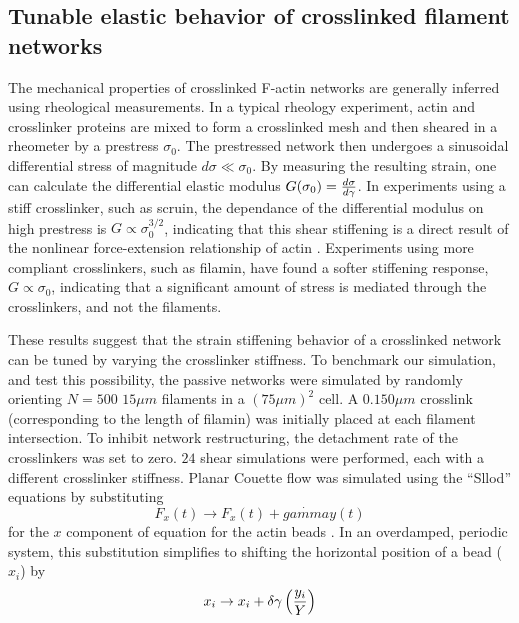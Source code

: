\documentclass[12pt]{article}
\begin{document}
\subsection{Tunable elastic behavior of crosslinked filament networks}
\par
The mechanical properties of crosslinked F-actin networks are generally
inferred using rheological measurements\cite{gardel2004,koenderink2006,kasza2009,lin2010}.
In a typical rheology experiment, actin and crosslinker proteins are mixed to
form a crosslinked mesh and then sheared in a rheometer by a prestress
$\sigma_0$. The prestressed network then undergoes a sinusoidal
differential stress of magnitude $d\sigma\ll\sigma_0$. By measuring the resulting
strain, one can calculate the differential elastic modulus
$G(\sigma_0) = {d\sigma\over d\gamma}$. In experiments using a stiff
crosslinker, such as scruin, the dependance of the differential modulus on high
prestress is $G\propto\sigma_0^{3/2}$, indicating that this shear stiffening is
a direct result of the nonlinear force-extension relationship of actin 
\cite{gardel2004,lin2010}. Experiments using more compliant crosslinkers,
such as filamin, have found a softer stiffening response, $G\propto\sigma_0$,
indicating that a significant amount of stress is mediated through the
crosslinkers, and not the filaments\cite{kasza2009}.
\par 
These results suggest that the strain stiffening behavior of a crosslinked 
network can be tuned by varying the crosslinker
stiffness. To benchmark our simulation, and test this possibility, the 
passive networks were simulated by randomly orienting $N = 500$ $15\mu m$ 
filaments in a $(75\mu m)^2$ cell. A $0.150\mu m$ crosslink
(corresponding to the length of filamin) was initially placed at each filament
intersection.  
To inhibit network restructuring, the detachment rate of the crosslinkers was 
set to zero. $24$ shear simulations were performed, each with a different 
crosslinker stiffness. 
Planar Couette flow was simulated using the ``Sllod'' equations by substituting
\begin{equation}
  F_x(t)\rightarrow F_x(t) + \dot{gamma}y(t)
  \label{eqn:evans}
\end{equation}
for the $x$ component of equation  for the actin beads 
\cite{evans1984}. In an overdamped, periodic system, this substitution 
simplifies to shifting the horizontal position of a bead ($x_i$) by 
\begin{equation}
  x_i \rightarrow x_i + \delta\gamma \left( {y_i\over Y} \right)
  \label{eqn:sllod}
\end{equation}
\end{document}
